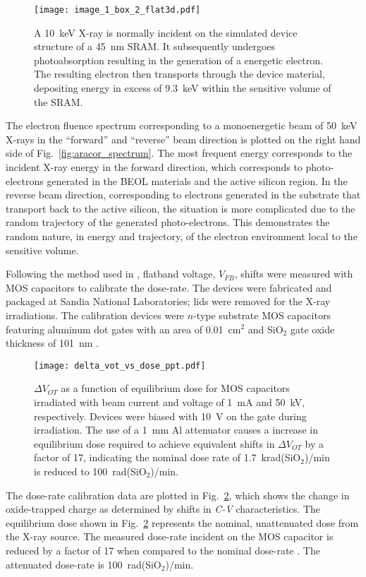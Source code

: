 \begin{figure}[htbp]
    \centering
        \texttt{[image: image\_1\_box\_2\_flat3d.pdf]}
        \caption{A 10~keV X-ray is normally incident on the simulated device structure of a 45~nm SRAM. It subsequently undergoes photoabsorption resulting in the generation of a energetic electron. The resulting electron then transports through the device material, depositing energy in excess of 9.3~keV within the sensitive volume of the SRAM.}
        \label{fig:photoabsorption_opendx}
\end{figure}

The electron fluence spectrum corresponding to a monoenergetic beam of 50~keV X-rays in the ``forward'' and ``reverse'' beam direction is plotted on the right hand side of Fig.~\ref{fig:aracor_spectrum}.
The most frequent energy corresponds to the incident X-ray energy in the forward direction, which corresponds to photo-electrons generated in the BEOL materials and the active silicon region.
In the reverse beam direction, corresponding to electrons generated in the substrate that transport back to the active silicon, the situation is more complicated due to the random trajectory of the generated photo-electrons. 
This demonstrates the random nature, in energy and trajectory, of the electron environment local to the sensitive volume.

Following the method used in \cite{Fleetwood:1986ug}, flatband voltage, $V_{FB}$, shifts were measured with MOS capacitors to calibrate the dose-rate. 
The devices were fabricated and packaged at Sandia National Laboratories; lids were removed for the X-ray irradiations. 
The calibration devices were $n$-type substrate MOS capacitors featuring aluminum dot gates with an area of 0.01~cm$^2$ and SiO$_2$ gate oxide thickness of 101~nm \cite{Schwank:1987fq}. 
\begin{figure}[tb]
    \centering
        \texttt{[image: delta\_vot\_vs\_dose\_ppt.pdf]}
    \caption{$\Delta V_{OT}$ as a function of equilibrium dose for MOS capacitors irradiated with beam current and voltage of 1~mA and 50~kV, respectively. Devices were biased with 10~V on the gate during irradiation. The use of a 1~mm Al attenuator causes a increase in equilibrium dose required to achieve equivalent shifts in $\Delta V_{OT}$ by a factor of 17, indicating the nominal dose rate of 1.7~krad(SiO$_2$)/min is reduced to 100~rad(SiO$_2$)/min.}
    \label{fig:delta_vot_vs_dose}
\end{figure}
The dose-rate calibration data are plotted in Fig.~\ref{fig:delta_vot_vs_dose}, which shows the change in oxide-trapped charge as determined by shifts in \emph{C-V} characteristics.
The equilibrium dose shown in Fig.~\ref{fig:delta_vot_vs_dose} represents the nominal, unattenuated dose from the X-ray source. 
The measured dose-rate incident on the MOS capacitor is reduced by a factor of 17 when compared to the nominal dose-rate \cite{Fleetwood:1986ug}. 
The attenuated dose-rate is 100~rad(SiO$_2$)/min. 

